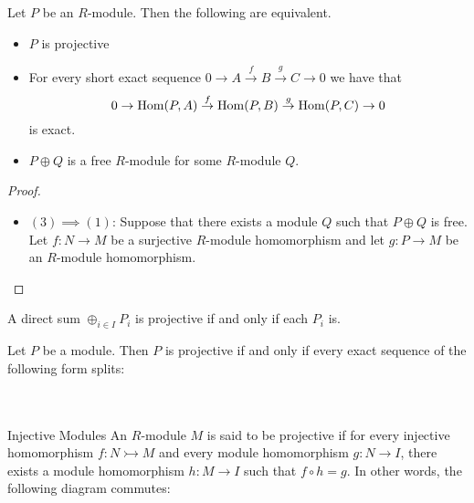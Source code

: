 \documentclass[a4paper]{article}
\begin{document}
\begin{thm}{}{} Let $P$ be an $R$-module. Then the following are equivalent. 
\begin{itemize}
\item $P$ is projective 
\item For every short exact sequence $0\to A\overset{f}{\to}B\overset{g}{\to}C\to 0$ we have that $$0\to \operatorname{Hom}(P,A)\overset{f}{\to}\operatorname{Hom}(P,B)\overset{g}{\to}\operatorname{Hom}(P,C)\to 0$$
is exact. 
\item $P\oplus Q$ is a free $R$-module for some $R$-module $Q$. 
\end{itemize} \tcbline
\begin{proof}~\\
\begin{itemize}
\item $(3)\implies(1)$: Suppose that there exists a module $Q$ such that $P\oplus Q$ is free. Let $f:N\to M$ be a surjective $R$-module homomorphism and let $g:P\to M$ be an $R$-module homomorphism. 
\end{itemize}
\end{proof}
\end{thm}

\begin{prp}{}{} A direct sum $\oplus_{i\in I}P_i$ is projective if and only if each $P_i$ is. 
\end{prp}

\begin{prp}{}{} Let $P$ be a module. Then $P$ is projective if and only if every exact sequence of the following form splits: \\~\\
 \\
\end{prp}

\begin{defn}{Injective Modules}{} An $R$-module $M$ is said to be projective if for every injective homomorphism $f:N\rightarrowtail M$ and every module homomorphism $g:N\to I$, there exists a module homomorphism $h:M\to I$ such that $f\circ h=g$. In other words, the following diagram commutes: \\~\\
 \\
\end{defn}
\end{document}
